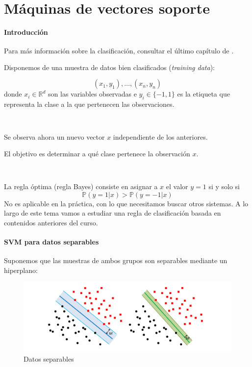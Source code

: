 \section{Máquinas de vectores soporte}

\paragraph{Introducción}

Para más información sobre la clasificación, consultar el último capítulo de \citep{ApuntesEstII}.
%

Disponemos de una muestra de datos bien clasificados (\textit{training data}):

\[
(x_1,y_1),\ldots, (x_n,y_n)
\]
donde $x_i\in \mathbb{R}^d$ son las variables observadas e $y_i\in\{-1,1\}$ es la etiqueta que representa la clase a la que pertenecen las observaciones.

\

Se observa ahora un nuevo vector $x$ independiente de los anteriores.

El objetivo es determinar a qué clase pertenece la observación $x$.

\

La regla óptima (regla Bayes) consiste en asignar a $x$ el valor $y=1$ si y solo si
\[
\mathbb{P}(y=1| x) > \mathbb{P}(y=-1|x)
\]
No es aplicable en la práctica, con lo que necesitamos buscar otros sistemas. 
%
A lo largo de este tema vamos a estudiar una regla de clasificación basada en contenidos anteriores del curso.

\paragraph{SVM para datos separables}

Suponemos que las muestras de ambos grupos son separables mediante un hiperplano:

\begin{figure}[hbtp]
\centering
\includegraphics[scale=0.7]{img/margen}
\caption{Datos separables}
\end{figure}

